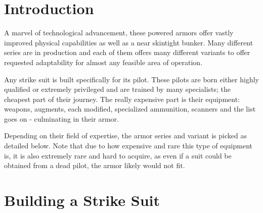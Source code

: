 \documentclass[12pt,a4paper,openany]{book}
\begin{document}
	

	\chapter{Introduction}
	A marvel of technological advancement, these powered armors offer vastly improved physical capabilities as well as a near skintight bunker. Many different series are in production and each of them offers many different variants to offer requested adaptability for almost any feasible area of operation.\par
	Any strike suit is built specifically for its pilot. These pilots are born either highly qualified or extremely privileged and are trained by many specialists; the cheapest part of their journey. The really expensive part is their equipment: weapons, augments, each modified, specialized ammunition, scanners and the list goes on - culminating in their armor.\par
	Depending on their field of expertise, the armor series and variant is picked as detailed below. Note that due to how expensive and rare this type of equipment is, it is also extremely rare and hard to acquire, as even if a suit could be obtained from a dead pilot, the armor likely would not fit.

	\chapter{Building a Strike Suit}
\end{document}
